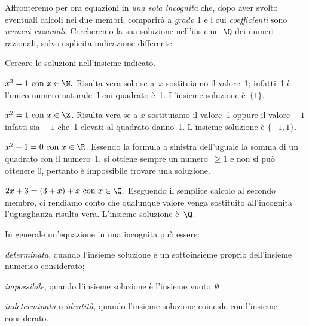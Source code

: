 Affronteremo per ora equazioni in
\emph{una sola incognita} che, dopo aver svolto eventuali calcoli nei due 
membri, comparirà a
\emph{grado} 1 e i cui \emph{coefficienti} sono \emph{numeri razionali}.
Cercheremo la sua soluzione
nell'insieme~\(\Q\) dei numeri razionali, salvo esplicita indicazione 
differente.
 \begin{esempio}{}{}
Cercare le soluzioni nell'insieme indicato.
 \begin{enumeratea}
 \item \(x^{2}=1 \text{ con }x\in\N.\)
Risulta vera solo se a~\(x\) sostituiamo il valore~1; infatti~1 è
l'unico numero naturale il cui quadrato è~1.
L'insieme soluzione è~\(\{1\}\).
 \item \(x^{2}=1 \text{ con }x\in\Z\).
Risulta vera se a
\(x\) sostituiamo il valore~1 oppure il valore~\(-1\) infatti sia~\(-1\) che~1
elevati al quadrato danno~1. L'insieme soluzione è
\(\{-1, 1\}\).
 \item \(x^{2}+1=0\text{ con }x\in\R\).
Essendo la formula a sinistra
dell'uguale la somma di un quadrato con il numero~1, si ottiene sempre
un numero~\(\geq1\) e non si può ottenere \(0\), pertanto è impossibile 
trovare 
una 
soluzione.
 \item \(2x+3=(3+x)+x \text{ con } x\in\Q\).
Eseguendo il semplice calcolo al secondo
membro, ci rendiamo conto che qualunque valore venga sostituito
all'incognita l'uguaglianza risulta
vera. L'insieme soluzione è~\(\Q\).
\end{enumeratea}
 \end{esempio}

In generale un'equazione in una incognita può essere:

\begin{enumeratea}
\item \emph{determinata}, quando l'insieme soluzione è un sottoinsieme proprio
dell'insieme numerico considerato;
\item \emph{impossibile}, quando l'insieme soluzione è l'insieme 
vuoto~\(\emptyset\)
\item \emph{indeterminata} o \emph{identità}, quando l'insieme soluzione 
coincide con
l'insieme considerato.
\end{enumeratea}

